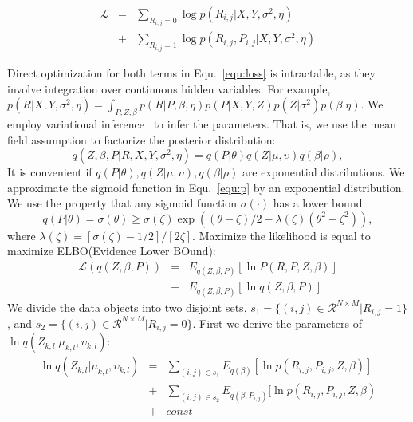 \documentclass[journal]{IEEEtran}
\begin{document}
\begin{eqnarray}\label{equ:loss}
\mathcal{L}&=&\sum_{R_{i,j}=0} \log p(R_{i,j}|X,Y,\sigma^2,\eta) \nonumber\\
&+& \sum_{R_{i,j}=1} \log p(R_{i,j},P_{i,j}|X,Y,\sigma^2,\eta)
\end{eqnarray}

Direct optimization for both terms in Equ.~\ref{equ:loss} is intractable, as they involve integration over continuous hidden variables. For example, $p(R|X,Y,\sigma^2,\eta)=\int_{P,Z,\beta} p(R|P,\beta,\eta) p(P|X,Y,Z) p(Z|\sigma^2) p(\beta|\eta) $. We employ variational inference~\cite{Variational} to infer the parameters. That is, we use the mean field assumption to factorize the posterior distribution: 
\begin{equation}
    q(Z,\beta,P|R,X,Y,\sigma^{2},\eta) = q(P|\theta)q(Z|\mu,\upsilon)q(\beta|\rho),
\end{equation}
It is convenient if $q(P|\theta),q(Z|\mu,\upsilon),q(\beta|\rho)$ are exponential distributions. We approximate the sigmoid function in Equ.~\ref{equ:p} by an exponential distribution. We use the property that any sigmoid function $\sigma(\cdot)$ has a lower bound:
\begin{equation}
q(P|\theta)=\sigma(\theta)\geq \sigma(\zeta)\exp{((\theta-\zeta)/2-\lambda(\zeta)(\theta^2-\zeta^2))},
\end{equation}
where $\lambda(\zeta)=[\sigma(\zeta)-1/2]/[2\zeta]$.
Maximize the likelihood is equal to maximize ELBO(Evidence Lower BOund):
\begin{eqnarray}\label{elbo}
    \mathcal{L}(q(Z,\beta ,P)) &=& E_{q(Z,\beta ,P)}[\ln P(R,P,Z,\beta)] \nonumber \\ &-&E_{q(Z,\beta,P)}[\ln q(Z,\beta,P)]
\end{eqnarray}
We divide the data objects into two disjoint sets, $s_1 = \{(i,j)\in \mathcal{R}^{N\times M}|R_{i,j}=1\}$, and $s_2= \{(i,j)\in \mathcal{R}^{N\times M}|R_{i,j}=0\}$.
First we derive the parameters of $\ln{q(Z_{k,l}|\mu_{k,l},\upsilon_{k,l})}$:
\begin{eqnarray*}
    \ln q(Z_{k,l}|\mu_{k,l},\upsilon_{k,l}) 
    &=& \sum_{(i,j)\in s_1}E_{q(\beta)}[\ln p(R_{i,j},P_{i,j},Z,\beta)]  \\
    &+& \sum_{(i,j)\in s_2}E_{q(\beta,P_{i,j})}[\ln p(R_{i,j},P_{i,j},Z,\beta) \\
    &+& const
\end{eqnarray*}
\end{document}
